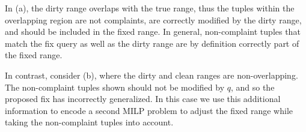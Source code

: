 In (a), the dirty range overlaps with the true range, thus the tuples within the overlapping 
region are not complaints, are correctly modified by the dirty range, and should be included
in the fixed range.  In general, non-complaint tuples that match the fix query as well as 
the dirty range are by definition correctly part of the fixed range.

In contrast, consider (b), where the dirty and clean ranges are non-overlapping.
The non-complaint tuples shown should not be modified by $q$, and so the proposed
fix has incorrectly generalized.  In this case we use this additional information to
encode a second MILP problem to adjust the fixed range while taking the non-complaint tuples
into account.




% 
